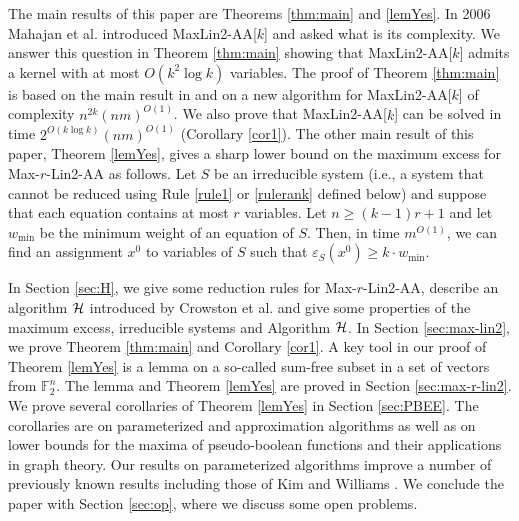 \documentclass{llncs}
\begin{document}
The main results of this paper are Theorems \ref{thm:main}
and \ref{lemYes}.
In 2006 Mahajan et al. \cite{MahajanRamanSikdar09} introduced {\sc MaxLin2-AA}[$k$] and asked what is its complexity.
We answer this question in Theorem \ref{thm:main} showing that {\sc MaxLin2-AA}[$k$] admits a kernel with at most $O(k^2\log k)$ variables.
The proof of Theorem \ref{thm:main} is based on the main result in \cite{CroGutJonKimRuz10} and
on a new algorithm for {\sc MaxLin2-AA}[$k$] of complexity $n^{2k}(nm)^{O(1)}$. We also prove that {\sc MaxLin2-AA}[$k$] can be solved in time
$2^{O(k\log k)}(nm)^{O(1)}$ (Corollary \ref{cor1}).
The other main result of this paper, Theorem \ref{lemYes}, gives
a sharp lower bound on the maximum excess for {\sc Max-$r$-Lin2-AA} as follows. Let $S$ be an irreducible system (i.e., a system that cannot
be reduced using Rule \ref{rule1} or \ref{rulerank} defined below) and suppose that each equation contains at most $r$ variables. Let $n\ge (k-1)r+1$ and let $w_{\min}$ be the minimum weight of an equation of $S$. Then, in time $m^{O(1)}$, we can find an assignment $x^0$ to variables of $S$  such that $\varepsilon_S(x^0)\ge k\cdot w_{\min}.$



In Section \ref{sec:H}, we give some reduction rules for {\sc Max-$r$-Lin2-AA}, describe an algorithm
$\cal H$ introduced by Crowston et al. \cite{CroGutJonKimRuz10} and give some properties of the maximum excess,
irreducible systems and Algorithm $\cal H$. In Section \ref{sec:max-lin2}, we prove Theorem \ref{thm:main} and
Corollary \ref{cor1}.
A key tool in our proof of Theorem \ref{lemYes} is a lemma on a so-called sum-free subset in a set of
vectors from $\mathbb{F}_2^n$. The lemma and Theorem \ref{lemYes} are proved in Section \ref{sec:max-r-lin2}.
We prove several corollaries of Theorem \ref{lemYes} in Section \ref{sec:PBEE}. The corollaries are on
parameterized and approximation algorithms as well as on lower bounds for the maxima of pseudo-boolean
functions and their applications in graph theory. Our results on parameterized algorithms improve a number of
previously known results including those of Kim and Williams \cite{KimWil}.
We conclude the paper with Section \ref{sec:op}, where we discuss some open problems.

\vspace{3mm}
\end{document}
